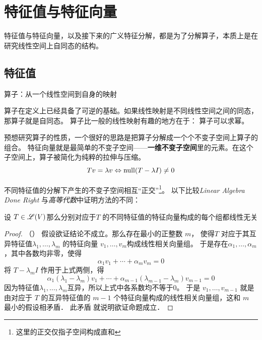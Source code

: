 \chapter{特征值与特征向量}
特征值与特征向量，以及接下来的广义特征分解，都是为了分解算子，本质上是在研究线性空间上自同态的结构。

\section{特征值}
\begin{definition}[算子]
    算子：从一个线性空间到自身的映射
\end{definition}

算子在定义上已经具备了可逆的基础。如果线性映射是不同线性空间之间的同态，那算子就是自同态。
算子比一般的线性映射有趣的地方在于： 算子可以求幂。

预想研究算子的性质，一个很好的思路是把算子分解成一个个不变子空间上算子的组合。
特征向量就是最简单的不变子空间——\textbf{一维不变子空间}里的元素。在这个子空间上，算子被简化为纯粹的拉伸与压缩。
\[
    Tv=\lambda v \Leftrightarrow \operatorname{null}(T-\lambda I)\neq {0}
\]

不同特征值的分解下产生的不变子空间相互``正交''\footnote{这里的正交仅指子空间构成直和}。
以下比较\textit{Linear Algebra Done Right} 与\textit{高等代数}中证明方法的不同：

\begin{theorem}[不同特征值对应特征向量无关]
    设 \(T \in \mathscr{L}(V)\)那么分别对应于\(T\) 的不同特征值的特征向量构成的每个组都线性无关
\end{theorem}

\begin{proof}
    （\cite[p.~114]{LinearAlgebraDone2024}）
    假设欲证结论不成立。那么存在最小的正整数 \(m\)， 使得\(T\)
    对应于其互异特征值\(\lambda_1, \dots ,\lambda_{m}\)
    的特征向量 \(v_1, \dots, v_m\)构成线性相关向量组。
    于是存在\(\alpha_1, \dots ,\alpha_{m}\)，其中各数均非零，使得
    \[\alpha_1 v_1 + \cdots + \alpha_m v_m = 0\]
    将 \(T-\lambda_{m}I\) 作用于上式两侧，得
    \[
        \alpha_1 (\lambda_1 - \lambda_m)v_1 + \cdots +
        \alpha_{m-1} (\lambda_{m-1} - \lambda_m)v_{m-1} = 0
    \]
    因为特征值\(\lambda_1,\dots ,\lambda_{m}\)互异，所以上式中各系数均不等于0。
    于是 \(v_1, \dots , v_{m-1}\) 就是由对应于 \(T\)
    的互异特征值的 \(m- 1\) 个特征向量构成的线性相关向量组，这和 \(m\) 最小的假设相矛盾． 此矛盾
    就说明欲证命题成立．
\end{proof}


